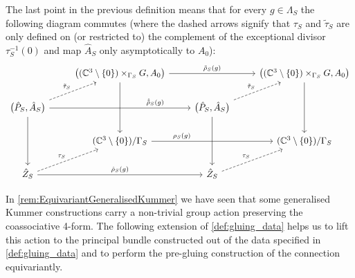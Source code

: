 \documentclass[11pt,a4paper]{scrartcl}
\numberwithin{equation}{section}
\theoremstyle{plain}
\theoremstyle{definition}
\theoremstyle{remark}
\begin{document}
\begin{remark}
The last point in the previous definition means that for every $g\in \Lambda_S$ the following diagram commutes (where the dashed arrows signify that $\tau_S$ and $\tilde{\tau}_S$ are only defined on (or restricted to) the complement of the exceptional divisor $\tau_S^{-1}(0)$ and map $\hat{A}_S$ only asymptotically to $A_0$):
\begin{equation*}
\begin{tikzcd}
& \big((\mathbb{C}^3\setminus\{0\})\times_{\Gamma_S} G,A_0\big) \arrow[rr, "\tilde{\rho}_S(g)"] \arrow[dd] &  & \big((\mathbb{C}^3\setminus\{0\})\times_{\Gamma_S} G,A_0\big) \arrow[dd] \\
\big(\hat{P}_S,\hat{A}_S\big)\arrow{rr}[near end] {\hat{\tilde{\rho}}_S(g)} \arrow[ur, dashed, "\tilde{\tau}_S"] \arrow[dd]&  & \big(\hat{P}_S,\hat{A}_S\big)\arrow[ur, dashed, "\tilde{\tau}_S"] \arrow[dd] &  \\
 & (\mathbb{C}^3\setminus\{0\})/\Gamma_S \arrow{rr}[near start]{\rho_S(g)}& & (\mathbb{C}^3\setminus\{0\})/\Gamma_S \\
\hat{Z}_S\arrow{rr}{\hat{\rho}_S(g)} \arrow[ur, dashed, "\tau_S"] & & \hat{Z}_S \arrow[ur, dashed, "\tau_S"] &  
\end{tikzcd}
\end{equation*}
\end{remark}

In \autoref{rem:EquivariantGeneralisedKummer} we have seen that some generalised Kummer constructions carry a non-trivial group action preserving the coassociative 4-form. The following extension of \autoref{def:gluing_data} helps us to lift this action to the principal bundle constructed out of the data specified in \autoref{def:gluing_data} and to perform the pre-gluing construction of the connection equivariantly.
\end{document}
